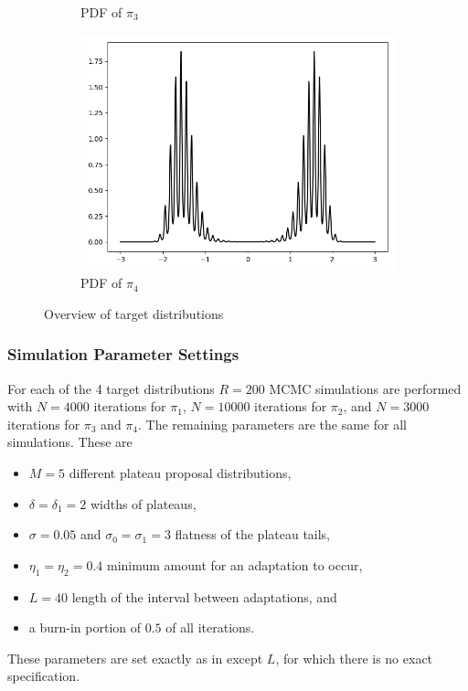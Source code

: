 \documentclass{scrartcl}
\begin{document}
\begin{figure}
\begin{subfigure}{.45\textwidth}
              \caption{PDF of $\pi_3$}
              \label{target_distributions_pi_3}
        \end{subfigure}
        \begin{subfigure}{.45\textwidth}
              \centering
              \includegraphics[width=.8\linewidth]{../figs/fig_3_pi_4.png}
              \caption{PDF of $\pi_4$}
              \label{target_distributions_pi_4}
        \end{subfigure}
        \caption{Overview of target distributions}
        \label{target_distributions}
    \end{figure}

    \subsubsection{Simulation Parameter Settings}
    For each of the 4 target distributions $R=200$ MCMC simulations are performed with $N=4000$ iterations for $\pi_1$, $N=10000$ iterations for $\pi_2$, and $N=3000$ iterations for $\pi_3$ and $\pi_4$.
    The remaining parameters are the same for all simulations. These are
    \begin{itemize}
        \item $M=5$ different plateau proposal distributions,
        \item $\delta=\delta_1=2$ widths of plateaus,
        \item $\sigma=0.05$ and $\sigma_0=\sigma_1=3$ flatness of the plateau tails,
        \item $\eta_1=\eta_2=0.4$ minimum amount for an adaptation to occur,
        \item $L=40$ length of the interval between adaptations, and
        \item a burn-in portion of $0.5$ of all iterations.
    \end{itemize}
    These parameters are set exactly as in \cite{lau2019} except $L$, for which there is no exact specification.
\end{document}
